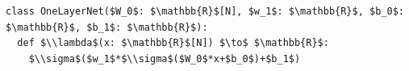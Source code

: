 \documentclass[border=10pt]{standalone}
\begin{document}
\begin{lstlisting}
class OneLayerNet($W_0$: $\mathbb{R}$[N], $w_1$: $\mathbb{R}$, $b_0$: $\mathbb{R}$, $b_1$: $\mathbb{R}$):
  def $\\lambda$(x: $\mathbb{R}$[N]) $\to$ $\mathbb{R}$:
    $\\sigma$($w_1$*$\\sigma$($W_0$*x+$b_0$)+$b_1$)
\end{lstlisting}
\end{document}
